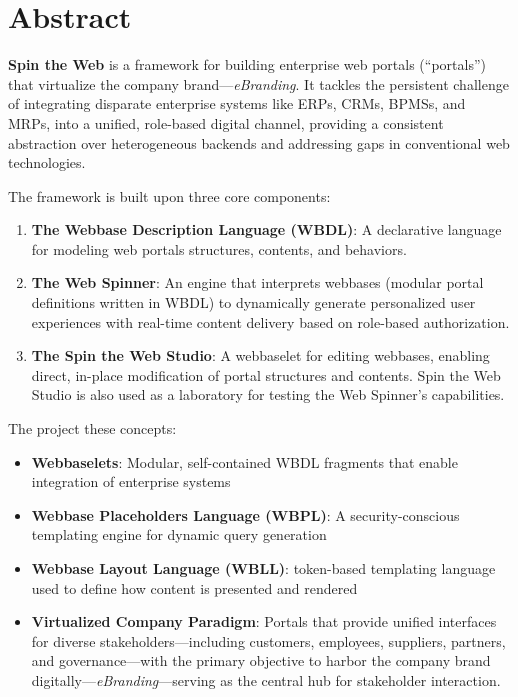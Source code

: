 
\chapter*{Abstract}

\textbf{Spin the Web} is a framework for building enterprise web portals (``portals'') that virtualize the company brand---\textit{eBranding}. It tackles the persistent challenge of integrating disparate enterprise systems like ERPs, CRMs, BPMSs, and MRPs, into a unified, role-based digital channel, providing a consistent abstraction over heterogeneous backends and addressing gaps in conventional web technologies.

The framework is built upon three core components:

\begin{enumerate}
\item \textbf{The Webbase Description Language (WBDL)}: A declarative language for modeling web portals structures, contents, and behaviors.
\item \textbf{The Web Spinner}: An engine that interprets webbases (modular portal definitions written in WBDL) to dynamically generate personalized user experiences with real-time content delivery based on role-based authorization.
\item \textbf{The Spin the Web Studio}: A webbaselet for editing webbases, enabling direct, in-place modification of portal structures and contents. Spin the Web Studio is also used as a laboratory for testing the Web Spinner's capabilities.
\end{enumerate}

The project these concepts:
\begin{itemize}
\item \textbf{Webbaselets}: Modular, self-contained WBDL fragments that enable integration of enterprise systems
\item \textbf{Webbase Placeholders Language (WBPL)}: A security-conscious templating engine for dynamic query generation
\item \textbf{Webbase Layout Language (WBLL)}: token-based templating language used to define how content is presented and rendered
\item \textbf{Virtualized Company Paradigm}: Portals that provide unified interfaces for diverse stakeholders—including customers, employees, suppliers, partners, and governance—with the primary objective to harbor the company brand digitally---\textit{eBranding}---serving as the central hub for stakeholder interaction.
\end{itemize}

